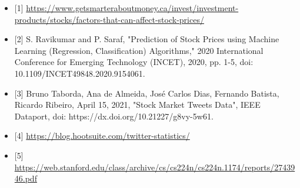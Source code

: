 \documentclass{article}
\begin{document}
\begin{itemize}
    \item {[1]} \url{https://www.getsmarteraboutmoney.ca/invest/investment-products/stocks/factors-that-can-affect-stock-prices/}
    \item {[2]} S. Ravikumar and P. Saraf, "Prediction of Stock Prices using Machine Learning (Regression, Classification) Algorithms," 2020 International Conference for Emerging Technology (INCET), 2020, pp. 1-5, doi: 10.1109/INCET49848.2020.9154061.
    \item {[3]} Bruno Taborda, Ana de Almeida, José Carlos Dias, Fernando Batista, Ricardo Ribeiro, April 15, 2021, "Stock Market Tweets Data", IEEE Dataport, doi: https://dx.doi.org/10.21227/g8vy-5w61.
    \item {[4]} \url{https://blog.hootsuite.com/twitter-statistics/}
    \item{[5]} \url{https://web.stanford.edu/class/archive/cs/cs224n/cs224n.1174/reports/2743946.pdf}
\end{itemize}
\end{document}
